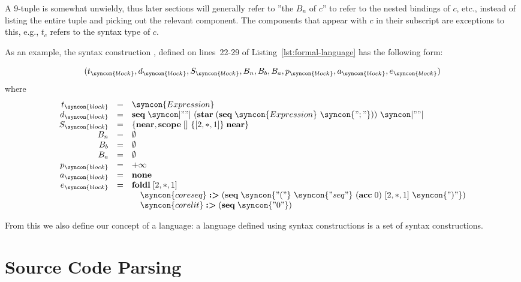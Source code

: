 \documentclass{kththesis}
\begin{document}
A 9-tuple is somewhat unwieldy, thus later sections will generally refer to ''the $B_n$ of $c$'' to refer to the nested bindings of $c$, etc., instead of listing the entire tuple and picking out the relevant component. The components that appear with $c$ in their subscript are exceptions to this, e.g., $t_c$ refers to the syntax type of $c$.

As an example, the syntax construction , defined on lines~22-29 of Listing~\ref{lst:formal-language} has the following form:

$$
(t_{\syncon{block}}, d_{\syncon{block}}, S_{\syncon{block}}, B_n, B_b, B_a, p_{\syncon{block}}, a_{\syncon{block}}, e_{\syncon{block}})
$$
where
$$
\begin{array}{rcl}
t_{\syncon{block}} &=&
\syncon{Expression}
\\

d_{\syncon{block}} &=&
\seq \syncon|"{"|\ (\repstar (\seq \syncon{Expression}\ \syncon{";"}))\ \syncon|"}"|
\\

S_{\syncon{block}} &=&
\{\near, \scope []\ \{[2, *, 1]\} \near\}
\\

B_n &=& \emptyset
\\

B_b &=& \emptyset
\\

B_a &=& \emptyset
\\

p_{\syncon{block}} &=& +\infty
\\

a_{\syncon{block}} &=& \textbf{none}
\\

e_{\syncon{block}} &=&
\foldl [2, *, 1] \\
& & \quad \syncon{coreseq} \tagged (\seq \syncon{"("}\ \syncon{"seq"}\ (\acc 0)\ [2, *, 1]\ \syncon{")"}) \\
& & \quad \syncon{corelit} \tagged (\seq \syncon{"0"}) \\
\end{array}
$$

From this we also define our concept of a language: a language defined using syntax constructions is a set of syntax constructions.

\section{Source Code Parsing}
\end{document}
